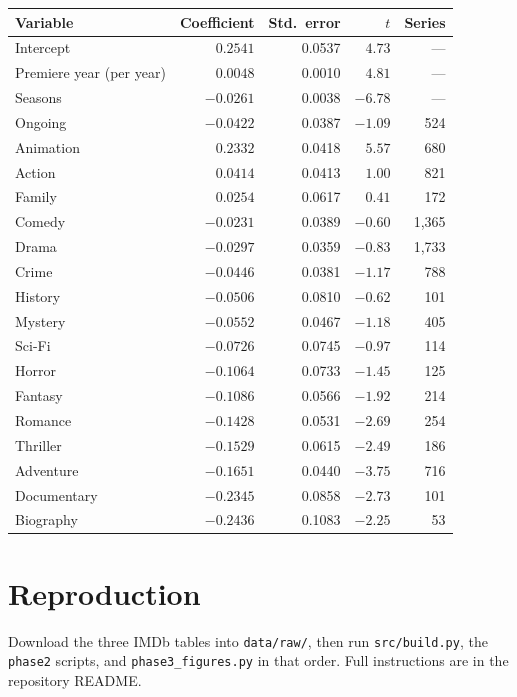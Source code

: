 \documentclass[11pt,a4paper]{article}
\begin{document}
\begin{minipage}{\linewidth}
\centering
\small
{}
\label{tab:ols}
\begin{tabular}{lrrrr}
\toprule
\textbf{Variable} & \textbf{Coefficient} & \textbf{Std.\ error} & $t$ & \textbf{Series} \\
\midrule
Intercept                 & $0.2541$  & 0.0537 & $4.73$  & --- \\
Premiere year (per year)  & $0.0048$  & 0.0010 & $4.81$  & --- \\
Seasons                   & $-0.0261$ & 0.0038 & $-6.78$ & --- \\
Ongoing                   & $-0.0422$ & 0.0387 & $-1.09$ & 524 \\
\midrule
Animation                 & $0.2332$  & 0.0418 & $5.57$  & 680 \\
Action                    & $0.0414$  & 0.0413 & $1.00$  & 821 \\
Family                    & $0.0254$  & 0.0617 & $0.41$  & 172 \\
Comedy                    & $-0.0231$ & 0.0389 & $-0.60$ & 1,365 \\
Drama                     & $-0.0297$ & 0.0359 & $-0.83$ & 1,733 \\
Crime                     & $-0.0446$ & 0.0381 & $-1.17$ & 788 \\
History                   & $-0.0506$ & 0.0810 & $-0.62$ & 101 \\
Mystery                   & $-0.0552$ & 0.0467 & $-1.18$ & 405 \\
Sci-Fi                    & $-0.0726$ & 0.0745 & $-0.97$ & 114 \\
Horror                    & $-0.1064$ & 0.0733 & $-1.45$ & 125 \\
Fantasy                   & $-0.1086$ & 0.0566 & $-1.92$ & 214 \\
Romance                   & $-0.1428$ & 0.0531 & $-2.69$ & 254 \\
Thriller                  & $-0.1529$ & 0.0615 & $-2.49$ & 186 \\
Adventure                 & $-0.1651$ & 0.0440 & $-3.75$ & 716 \\
Documentary               & $-0.2345$ & 0.0858 & $-2.73$ & 101 \\
Biography                 & $-0.2436$ & 0.1083 & $-2.25$ & 53 \\
\bottomrule
\end{tabular}
\end{minipage}

\section{Reproduction}

Download the three IMDb tables into \texttt{data/raw/}, then run
\texttt{src/build.py}, the \texttt{phase2} scripts, and
\texttt{phase3\_figures.py} in that order. Full instructions are in the
repository README.
\end{document}

